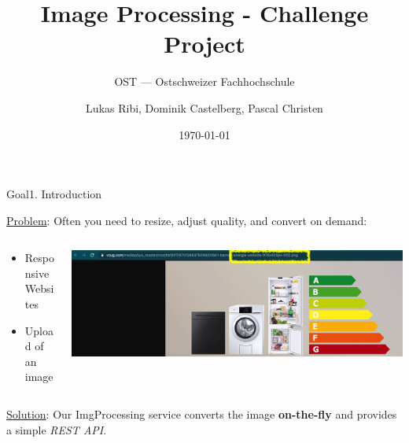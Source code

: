 \documentclass[aspectratio=169,20pt]{beamer}
\title{Image Processing - Challenge Project}
\subtitle{OST — Ostschweizer Fachhochschule}
\date{\today}
\author{Lukas Ribi, Dominik Castelberg, Pascal Christen}
\institute{DS1 - Thomas Bocek }
\begin{document}
\begin{frame}
	\titlepage
\end{frame}

\begin{frame}{Goal}{1. Introduction}

	\underline{Problem}: Often you need to resize, adjust quality, and convert on demand:
	\vspace{1in}
	\begin{columns}[onlytextwidth,T]
		\begin{column}{.25\linewidth}
			\begin{itemize}
				\item{Responsive Websites}
				\item{Upload of an image}
			\end{itemize}
		\end{column}
		\begin{column}{.65\linewidth}
			\includegraphics[scale=0.55]{vzug}
		\end{column}
	\end{columns}

	\underline{Solution}: Our ImgProcessing service converts the image \textbf{on-the-fly} and provides a simple \textit{REST API}.

\end{frame}
\end{document}
